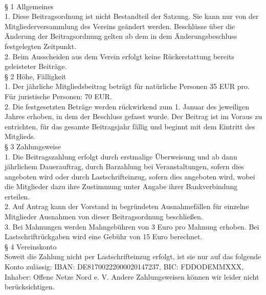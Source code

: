 \documentclass[a4paper,8pt]{article}
\begin{document}
\ \\

§ 1 Allgemeines
\\

1. Diese Beitragsordnung ist nicht Bestandteil der Satzung. Sie kann nur von der Mitgliederversammlung des Vereins geändert werden. Beschlüsse über die Änderung der Beitragsordnung gelten ab dem in dem Änderungsbeschluss festgelegten Zeitpunkt.
\\

2. Beim Ausscheiden aus dem Verein erfolgt keine Rückerstattung bereits geleisteter Beiträge.
\\

§ 2 Höhe, Fälligkeit
\\

1. Der jährliche Mitgliedsbeitrag beträgt für natürliche Personen 35 EUR pro. Für juristische Personen: 70 EUR. 
\\

2. Die festgesetzten Beträge werden rückwirkend zum 1. Januar des jeweiligen Jahres erhoben, in dem der Beschluss gefasst wurde. Der Beitrag ist im Voraus zu entrichten, für das gesamte Beitragsjahr fällig und beginnt mit dem Eintritt des Mitglieds.
\\

§ 3 Zahlungsweise
\\

1. Die Beitragszahlung erfolgt durch erstmalige Überweisung und ab dann jährlichem Dauerauftrag, durch Barzahlung bei Veranstaltungen, sofern dies angeboten wird oder durch Lastschrifteinzug, sofern dies angeboten wird, wobei die Mitglieder dazu ihre Zustimmung unter Angabe ihrer Bankverbindung erteilen. 
\\

2. Auf  Antrag kann der Vorstand in begründeten Ausnahmefällen für einzelne Mitglieder Ausnahmen von dieser Beitragsordnung beschließen.
\\

3. Bei Mahnungen werden Mahngebühren von 3 Euro pro Mahnung erhoben. Bei  Lastschriftrückgaben wird eine Gebühr von 15 Euro berechnet.
\\

§ 4 Vereinskonto
\\

Soweit die Zahlung nicht per Lastschrifteinzug erfolgt, ist sie nur auf das folgende Konto zulässig: IBAN: DE81700222000020147237, BIC: FDDODEMMXXX, Inhaber: Offene Netze Nord e. V. Andere Zahlungsweisen können wir leider nicht berücksichtigen.
\\
\end{document}
